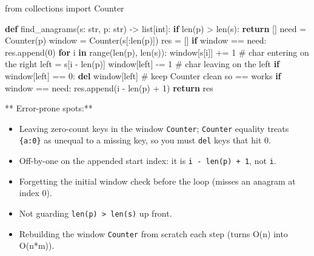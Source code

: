 \documentclass[11pt]{article}
\providecommand{\tightlist}{\setlength{\itemsep}{1pt}\setlength{\parskip}{0pt}}
\newenvironment{Shaded}{\begin{snugshade}}{\end{snugshade}}
\newcommand{\BuiltInTok}[1]{\textcolor[rgb]{0.50,0.55,0.55}{#1}}
\newcommand{\CommentTok}[1]{\textcolor[rgb]{0.48,0.49,0.49}{#1}}
\newcommand{\ControlFlowTok}[1]{\textcolor[rgb]{0.99,0.74,0.29}{\textbf{#1}}}
\newcommand{\DecValTok}[1]{\textcolor[rgb]{0.96,0.45,0.00}{#1}}
\newcommand{\ImportTok}[1]{\textcolor[rgb]{0.15,0.68,0.38}{#1}}
\newcommand{\KeywordTok}[1]{\textcolor[rgb]{0.81,0.81,0.76}{\textbf{#1}}}
\newcommand{\NormalTok}[1]{\textcolor[rgb]{0.81,0.81,0.76}{#1}}
\newcommand{\OperatorTok}[1]{\textcolor[rgb]{0.81,0.81,0.76}{#1}}
\begin{document}
\begin{Shaded}
\begin{Highlighting}[]
\ImportTok{from}\NormalTok{ collections }\ImportTok{import}\NormalTok{ Counter}

\KeywordTok{def}\NormalTok{ find\_anagrams(s: }\BuiltInTok{str}\NormalTok{, p: }\BuiltInTok{str}\NormalTok{) }\OperatorTok{{-}\textgreater{}} \BuiltInTok{list}\NormalTok{[}\BuiltInTok{int}\NormalTok{]:}
    \ControlFlowTok{if} \BuiltInTok{len}\NormalTok{(p) }\OperatorTok{\textgreater{}} \BuiltInTok{len}\NormalTok{(s):}
        \ControlFlowTok{return}\NormalTok{ []}
\NormalTok{    need }\OperatorTok{=}\NormalTok{ Counter(p)}
\NormalTok{    window }\OperatorTok{=}\NormalTok{ Counter(s[:}\BuiltInTok{len}\NormalTok{(p)])}
\NormalTok{    res }\OperatorTok{=}\NormalTok{ []}
    \ControlFlowTok{if}\NormalTok{ window }\OperatorTok{==}\NormalTok{ need:}
\NormalTok{        res.append(}\DecValTok{0}\NormalTok{)}
    \ControlFlowTok{for}\NormalTok{ i }\KeywordTok{in} \BuiltInTok{range}\NormalTok{(}\BuiltInTok{len}\NormalTok{(p), }\BuiltInTok{len}\NormalTok{(s)):}
\NormalTok{        window[s[i]] }\OperatorTok{+=} \DecValTok{1}                 \CommentTok{\# char entering on the right}
\NormalTok{        left }\OperatorTok{=}\NormalTok{ s[i }\OperatorTok{{-}} \BuiltInTok{len}\NormalTok{(p)]}
\NormalTok{        window[left] }\OperatorTok{{-}=} \DecValTok{1}                 \CommentTok{\# char leaving on the left}
        \ControlFlowTok{if}\NormalTok{ window[left] }\OperatorTok{==} \DecValTok{0}\NormalTok{:}
            \KeywordTok{del}\NormalTok{ window[left]              }\CommentTok{\# keep Counter clean so == works}
        \ControlFlowTok{if}\NormalTok{ window }\OperatorTok{==}\NormalTok{ need:}
\NormalTok{            res.append(i }\OperatorTok{{-}} \BuiltInTok{len}\NormalTok{(p) }\OperatorTok{+} \DecValTok{1}\NormalTok{)}
    \ControlFlowTok{return}\NormalTok{ res}
\end{Highlighting}
\end{Shaded}

** Error-prone spots:**

\begin{itemize}
\tightlist
\item
  Leaving zero-count keys in the window \texttt{Counter}; \texttt{Counter} equality treats \texttt{\{\textquotesingle{}a\textquotesingle{}:0\}} as unequal to a missing key, so you must \texttt{del} keys that hit 0.
\item
  Off-by-one on the appended start index: it is \texttt{i\ -\ len(p)\ +\ 1}, not \texttt{i}.
\item
  Forgetting the initial window check before the loop (misses an anagram at index 0).
\item
  Not guarding \texttt{len(p)\ \textgreater{}\ len(s)} up front.
\item
  Rebuilding the window \texttt{Counter} from scratch each step (turns O(n) into O(n*m)).
\end{itemize}
\end{document}
